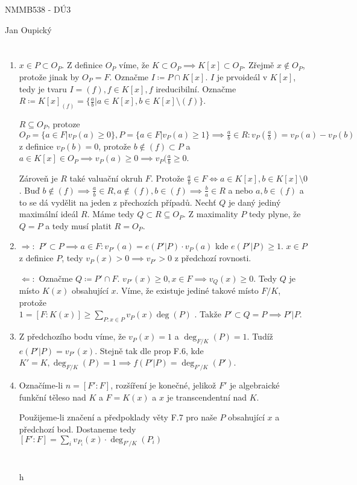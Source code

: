 \documentclass[12pt, a4paper]{article}
\begin{document}
\begin{center}
\large NMMB538 - DÚ3

\normalsize Jan Oupický
\end{center}
\vspace{1\baselineskip}

\section{}
\begin{enumerate}
    \item $x \in P \subset O_P$. Z definice $O_P$ víme, že $K \subset O_P \implies K[x] \subset O_P$. Zřejmě $x\notin O_P$, protože jinak by $O_P = F$. Označme $I \coloneqq P \cap K[x]$. $I$ je prvoideál v $K[x]$, tedy je tvaru $I = (f), f \in K[x], f$ ireducibilní. Označme $R \coloneqq K[x]_{(f)} = \{ \frac{a}{b} | a \in K[x], b \in K[x] \setminus (f) \}$. 

    $R \subseteq O_P$, protoze $O_P = \{a \in F | v_P(a) \geq 0 \}, P = \{ a \in F | v_P(a) \geq 1 \} \implies \frac{a}{b} \in R: v_P(\frac{a}{b}) = v_P(a)-v_P(b)$ z definice $v_P(b)=0$, protože $b \notin (f) \subset P$ a $a \in K[x] \in O_P \implies v_P(a) \geq 0 \implies v_P(\frac{a}{b} \geq 0$. 

    Zároveň je $R$ také valuační okruh $F$. Protože $\frac{a}{b} \in F \iff a \in K[x], b \in K[x]\setminus 0$. Buď $b \notin (f) \implies \frac{a}{b} \in R, a \notin (f), b \in (f) \implies \frac{b}{a} \in R$ a nebo $a,b \in (f)$ a to se dá vydělit na jeden z přechozích případů. Nechť $Q$ je daný jediný maximální ideál $R$. Máme tedy $Q \subset R \subseteq O_P$. Z maximality $P$ tedy plyne, že $Q = P$ a tedy musí platit $R = O_P$.

    \item $\Rightarrow:$ $P' \subset P \implies a\in F : v_{P'}(a) = e(P'|P)\cdot v_P(a)$ kde $e(P'|P)\geq 1$. $x \in P$ z definice $P$, tedy $v_P(x) > 0 \implies v_{P'} > 0$ z předchozí rovnosti.

    $\Leftarrow:$ Označme $Q \coloneqq P' \cap F$. $v_{P'}(x)\geq 0, x \in F \implies v_Q(x) \geq 0$. Tedy $Q$ je místo $K(x)$ obsahující $x$. Víme, že existuje jediné takové místo $F/K$, protože \\$1=[F:K(x)]\geq \sum_{P:x\in P} v_P(x)\deg(P)$ . Takže $P' \subset Q = P \implies P' | P$.

    \item Z předchozího bodu víme, že $v_P(x)=1$ a $\deg_{F/K}(P)=1$. Tudíž $e(P'|P)=v_{P'}(x)$. Stejně tak dle prop F.6, kde $K'=K, \deg_{F/K}(P)=1 \implies f(P'|P)=\deg_{F'/K}(P')$.
    \item Označíme-li $n = [F':F]$, rozšíření je konečné, jelikož $F'$ je algebraické funkční těleso nad $K$ a $F=K(x)$ a $x$ je transcendentní nad $K$.

    Použijeme-li značení a předpoklady věty F.7 pro naše $P$ obsahující $x$ a předchozí bod. Dostaneme tedy \\$[F':F]=\sum_i v_{P_i}(x)\cdot \deg_{F'/K}(P_i)$

\section{}
h
\end{enumerate}
\end{document}
